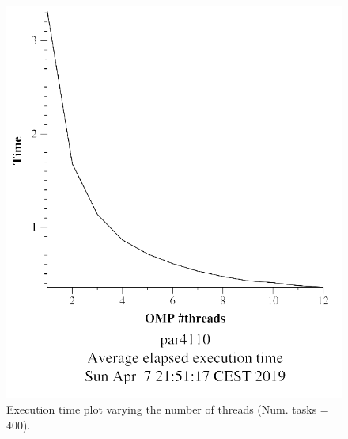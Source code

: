 \documentclass[12pt, a4paper]{article}
\begin{document}
\begin{figure}[H]
\centering
\begin{minipage}[b]{0.4\linewidth}
  \centering
  \includegraphics[scale=0.5]{./mandel-omp-10000-strong-omp-24-400-time}
  \caption{Execution time plot varying the number of threads (Num. tasks = 400).}
  \label{fig:mandel-omp-10000-strong-omp-24-400-time}
\end{minipage}%
\hspace{0.5cm}
\begin{minipage}[b]{0.4\linewidth}
  \centering

\end{minipage}
\end{figure}
\end{document}
